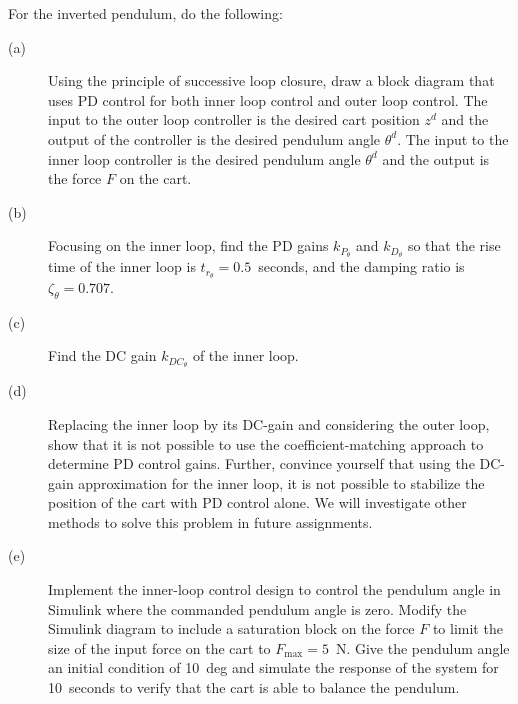 For the inverted pendulum, do the following:
\begin{description}
\item[(a)] Using the principle of successive loop closure, draw a block diagram that uses PD control for both inner loop control and outer loop control. The input to the outer loop controller is the desired cart position $z^d$ and the output of the controller is the desired pendulum angle $\theta^d$.  The input to the inner loop controller is the desired pendulum angle $\theta^d$ and the output is the force $F$ on the cart.
\item[(b)] Focusing on the inner loop, find the PD gains $k_{P_\theta}$ and $k_{D_\theta}$ so that the rise time of the inner loop is $t_{r_\theta}=0.5$~seconds, and the damping ratio is $\zeta_{\theta}=0.707$.
\item[(c)] Find the DC gain $k_{DC_\theta}$ of the inner loop.
\item[(d)] Replacing the inner loop by its DC-gain and considering the outer loop, show that it is not possible to use the coefficient-matching approach to determine PD control gains. Further, convince yourself that using the DC-gain approximation for the inner loop, it is not possible to stabilize the position of the cart with PD control alone. We will investigate other methods to solve this problem in future assignments.
\item[(e)] Implement the inner-loop control design to control the pendulum angle in Simulink where the commanded pendulum angle is zero. Modify the Simulink diagram to include a saturation block on the force $F$ to limit the size of the input force on the cart to $F_{\max}=5$~N. Give the pendulum angle an initial condition of 10~deg and simulate the response of the system for 10~seconds to verify that the cart is able to balance the pendulum. 
\end{description}
